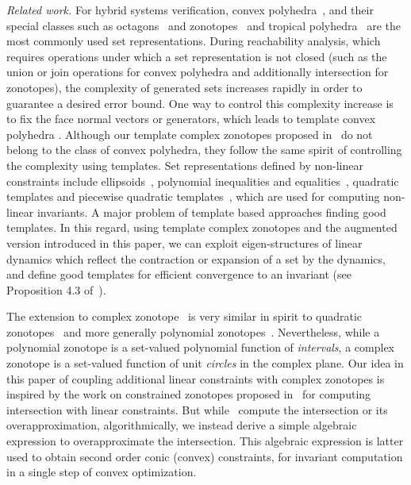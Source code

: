 

\emph{Related work.} For hybrid systems verification, convex polyhedra~\cite{CousotHalbwachs78,jeannet2009apron}, and their special classes such as
octagons~\cite{DBLP:journals/lisp/Mine06} and
zonotopes~\cite{DBLP:conf/hybrid/Girard05,DBLP:conf/eucc/MaigaCRT14}
and tropical polyhedra~\cite{DBLP:conf/sas/AllamigeonGG08} are the
most commonly used set representations. During reachability analysis,
which requires operations under which a set representation is not
closed (such as the union or join operations for convex polyhedra and
additionally intersection for zonotopes), the complexity of generated
sets increases rapidly in order to guarantee a desired error
bound. One way to control this complexity increase is to fix the face
normal vectors or generators, which leads to template convex
polyhedra \cite{Sankaranarayanan+Dang+Ivancic-08-Symbolic,DBLP:conf/aplas/DangG11}. Although
our template complex zonotopes proposed in~\cite{tcz2017} do not
belong to the class of convex polyhedra, they follow the same spirit
of controlling the complexity using templates. Set representations
defined by non-linear constraints include
ellipsoids~\cite{Kurzhanski2000201}, polynomial
inequalities\cite{DBLP:conf/sas/BagnaraRZ05} and
equalities~\cite{Rodriguez-Carbonell:2007}, quadratic templates and
piecewise quadratic templates~\cite{%
DBLP:conf/hybrid/RouxJGF12,DBLP:conf/fm/RouxG14,DBLP:conf/hybrid/Adje17},
which are used for computing non-linear invariants. A major problem of
template based approaches finding good templates.  In this regard,
using template complex zonotopes and the augmented version introduced
in this paper, we can exploit eigen-structures of linear dynamics
which reflect the contraction or expansion of a set by the dynamics,
and define good templates for efficient convergence to an invariant
(see Proposition 4.3 of~\cite{adimoolamACC2016}).

The extension to complex zonotope~\cite{adimoolamACC2016} is
very similar in spirit to quadratic
zonotopes~\cite{DBLP:conf/aplas/AdjeGW15} and more generally
polynomial zonotopes~\cite{DBLP:conf/hybrid/Althoff13}. Nevertheless,
while a polynomial zonotope is a set-valued polynomial function
of \emph{intervals}, a complex zonotope is a set-valued function of
unit \emph{circles} in the complex plane.  Our idea in this paper of coupling
additional linear constraints with complex zonotopes is inspired by the work
on constrained zonotopes proposed
in~\cite{DBLP:conf/cav/GhorbalGP09,scott2016constrained} for computing
intersection with linear constraints.  But
while~\cite{DBLP:conf/cav/GhorbalGP09,scott2016constrained} compute
the intersection or its overapproximation, algorithmically, we instead
derive a simple algebraic expression to overapproximate the
intersection.  This algebraic expression is latter used to obtain
second order conic (convex) constraints, for invariant computation in
a single step of convex optimization.

